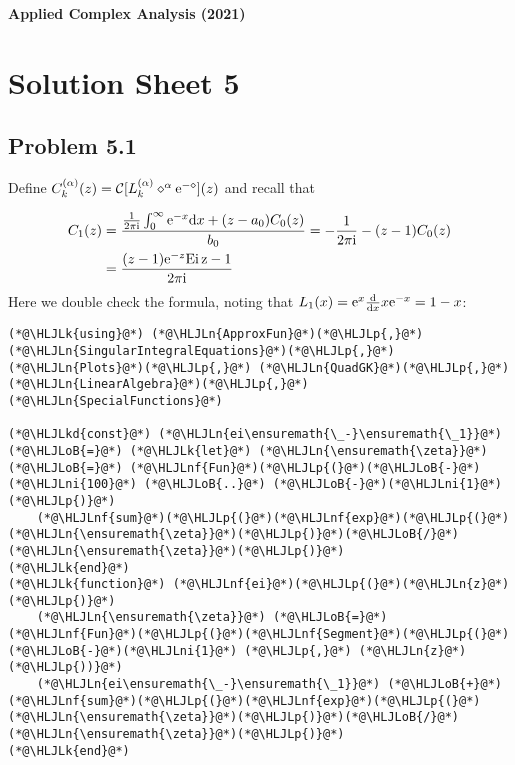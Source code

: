\documentclass[12pt,landscape]{article}
\newcommand{\HLJLk}[1]{\textcolor[RGB]{148,91,176}{\textbf{#1}}}
\newcommand{\HLJLkd}[1]{\textcolor[RGB]{214,102,97}{\textit{#1}}}
\newcommand{\HLJLn}[1]{#1}
\newcommand{\HLJLnf}[1]{\textcolor[RGB]{66,102,213}{#1}}
\newcommand{\HLJLni}[1]{\textcolor[RGB]{59,151,46}{#1}}
\newcommand{\HLJLoB}[1]{\textcolor[RGB]{102,102,102}{\textbf{#1}}}
\newcommand{\HLJLp}[1]{#1}
\def\D{ {\rm d} }
\def\I{ {\rm i} }
\def\E{ {\rm e} }
\def\CC{ {\cal C} }
\def\Ei{ {\rm Ei}\, }
\def\dx{\D x}
\def\Ei{\rm Ei\,}
\begin{document}
{\LARGE
\sf
\textbf{Applied Complex Analysis (2021)}

\section{Solution Sheet 5}
\subsection{Problem 5.1}
Define $C_k^{(\alpha)}(z) = \CC[L_k^{(\alpha)} \diamond^\alpha \E^{-\diamond}](z)$ and recall that


\begin{align*}
C_1(z)  &= {{1 \over 2 \pi \I} \int_0^\infty \E^{-x} \dx + (z-a_0) C_0(z) \over b_0} = -{1 \over 2 \pi \I}  - (z-1) C_0(z)    \\
&= {(z-1) \E^{-z} \Ei z -1 \over 2 \pi \I}
\end{align*}
Here we double check the formula, noting that $L_1(x) = \E^x {\D \over \dx} x \E^{-x} = 1 - x$:


\begin{lstlisting}
(*@\HLJLk{using}@*) (*@\HLJLn{ApproxFun}@*)(*@\HLJLp{,}@*) (*@\HLJLn{SingularIntegralEquations}@*)(*@\HLJLp{,}@*) (*@\HLJLn{Plots}@*)(*@\HLJLp{,}@*) (*@\HLJLn{QuadGK}@*)(*@\HLJLp{,}@*) (*@\HLJLn{LinearAlgebra}@*)(*@\HLJLp{,}@*) (*@\HLJLn{SpecialFunctions}@*)

(*@\HLJLkd{const}@*) (*@\HLJLn{ei\ensuremath{\_-}\ensuremath{\_1}}@*) (*@\HLJLoB{=}@*) (*@\HLJLk{let}@*) (*@\HLJLn{\ensuremath{\zeta}}@*) (*@\HLJLoB{=}@*) (*@\HLJLnf{Fun}@*)(*@\HLJLp{(}@*)(*@\HLJLoB{-}@*)(*@\HLJLni{100}@*) (*@\HLJLoB{..}@*) (*@\HLJLoB{-}@*)(*@\HLJLni{1}@*)(*@\HLJLp{)}@*)
    (*@\HLJLnf{sum}@*)(*@\HLJLp{(}@*)(*@\HLJLnf{exp}@*)(*@\HLJLp{(}@*)(*@\HLJLn{\ensuremath{\zeta}}@*)(*@\HLJLp{)}@*)(*@\HLJLoB{/}@*)(*@\HLJLn{\ensuremath{\zeta}}@*)(*@\HLJLp{)}@*)
(*@\HLJLk{end}@*)
(*@\HLJLk{function}@*) (*@\HLJLnf{ei}@*)(*@\HLJLp{(}@*)(*@\HLJLn{z}@*)(*@\HLJLp{)}@*)
    (*@\HLJLn{\ensuremath{\zeta}}@*) (*@\HLJLoB{=}@*) (*@\HLJLnf{Fun}@*)(*@\HLJLp{(}@*)(*@\HLJLnf{Segment}@*)(*@\HLJLp{(}@*)(*@\HLJLoB{-}@*)(*@\HLJLni{1}@*) (*@\HLJLp{,}@*) (*@\HLJLn{z}@*)(*@\HLJLp{))}@*)
    (*@\HLJLn{ei\ensuremath{\_-}\ensuremath{\_1}}@*) (*@\HLJLoB{+}@*) (*@\HLJLnf{sum}@*)(*@\HLJLp{(}@*)(*@\HLJLnf{exp}@*)(*@\HLJLp{(}@*)(*@\HLJLn{\ensuremath{\zeta}}@*)(*@\HLJLp{)}@*)(*@\HLJLoB{/}@*)(*@\HLJLn{\ensuremath{\zeta}}@*)(*@\HLJLp{)}@*)
(*@\HLJLk{end}@*)


\end{lstlisting}}
\end{document}
